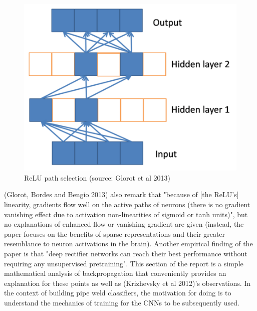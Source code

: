 \documentclass[a4paper,11pt]{article}
\begin{document}
\begin{figure}[h!]
	\centering
	\includegraphics[scale=0.4]{images/ReLU_path_selection.png}
	\caption{ReLU path selection (source: Glorot et al 2013)}
\end{figure}

(Glorot, Bordes and Bengio 2013) also remark that "because of [the ReLU's] linearity, gradients flow well on the active paths of neurons (there is no gradient vanishing effect due to activation non-linearities of sigmoid or tanh units)", but no explanations of enhanced flow or vanishing gradient are given (instead, the paper focuses on the benefits of sparse representations and their greater resemblance to neuron activations in the brain). Another empirical finding of the paper is that "deep rectifier networks can reach their best performance without requiring any unsupervised pretraining". This section of the report is a simple mathematical analysis of backpropagation that conveniently provides an explanation for these points as well as (Krizhevsky et al 2012)'s observations. In the context of building pipe weld classifiers, the motivation for doing is to understand the mechanics of training for the CNNs to be subsequently used. \\
\end{document}
